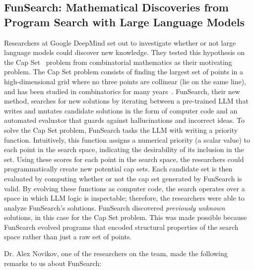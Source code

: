\subsection{FunSearch: Mathematical Discoveries from Program Search with Large Language Models~\citep{RomeraParedes2023}}
\label{sec:funsearch}

Researchers at Google DeepMind set out to investigate whether or not large language models could discover new knowledge. They tested this hypothesis on the Cap Set~\citep{pellegrino1970capset} problem from combinatorial mathematics as their motivating problem. 
The Cap Set problem consists of finding the largest set of points in a high-dimensional grid where no three points are collinear (lie on the same line), and has been studied in combinatorics for many years~\citep{pellegrino1970capset, roth1953certain}.
FunSearch, their new method, searches for new solutions by iterating between a pre-trained LLM that writes and mutates candidate solutions in the form of computer code and an automated evaluator that guards against hallucinations and incorrect ideas.
To solve the Cap Set problem, FunSearch tasks the LLM with writing a priority function. 
Intuitively, this function assigns a numerical priority (a scalar value) to each point in the search space, indicating the desirability of its inclusion in the set. 
Using these scores for each point in the search space, the researchers could programmatically create new potential cap sets.
Each candidate set is then evaluated by computing whether or not the cap set generated by FunSearch is valid.
By evolving these functions as computer code, the search operates over a space in which LLM logic is inspectable; therefore, the researchers were able to analyze FunSearch's solutions.
FunSearch discovered \textit{previously unknown} solutions, in this case for the Cap Set problem. 
This was made possible because FunSearch evolved programs that encoded structural properties of the search space rather than just a raw set of points.

Dr. Alex Novikov, one of the researchers on the team, made the following remarks to us about FunSearch:

